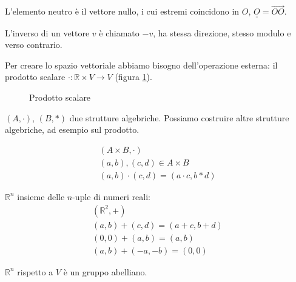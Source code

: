 L'elemento neutro \`e il vettore nullo, i cui estremi coincidono in $O$, $\underline{\underline{O}} = \overrightarrow{OO}$. 

L'inverso di un vettore $v$ \`e chiamato $-v$, ha stessa direzione, stesso modulo e verso contrario.

Per creare lo spazio vettoriale abbiamo bisogno dell'operazione esterna: il prodotto scalare $ \cdot : \mathbb{R} \times V \to V$ (figura \ref{fig:prodotto_scallare}).

\begin{figure}[ht]
\centering
{}
\caption{\label{fig:prodotto_scallare}Prodotto scalare}
\end{figure}

$(A, \cdot)$, $(B, \ast)$ due strutture algebriche. Possiamo costruire altre strutture algebriche, ad esempio sul prodotto.

\begin{gather*}
(A \times B, \cdot) \\
(a,b), (c,d) \in A \times B \\
(a,b) \cdot (c,d) = (a \cdot c, b \ast d)
\end{gather*}

$\mathbb{R}^n$ insieme delle $n$-uple di numeri reali:
\begin{gather*}
(\mathbb{R}^2, +) \\
(a,b) + (c,d) = (a+c,b+d) \\
(0,0) + (a,b) = (a,b) \\
(a,b) + (-a,-b) = (0,0)
\end{gather*}

$\mathbb{R}^n$ rispetto a $V$ \`e un gruppo abelliano.

